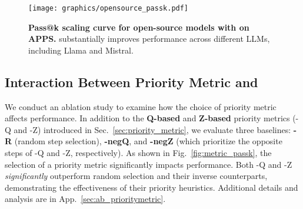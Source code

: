 \begin{figure}
    \centering
    \vspace{-0.3cm}\texttt{[image: graphics/opensource\_passk.pdf]}
    \vspace{-0.3cm}
    \caption{\textbf{Pass@k scaling curve for open-source models with \decomp on APPS.} \decomp substantially improves performance across different LLMs, including Llama and Mistral.}
    \vspace{-0.6cm}
    \label{fig:opensource_passk}
\end{figure}



\subsection{Interaction Between Priority Metric and \decomp}

We conduct an ablation study to examine how the choice of priority metric affects \decomp performance. In addition to the \textbf{Q-based} and \textbf{Z-based} priority metrics (\decomp-Q and \decomp-Z) introduced in Sec.~\ref{sec:priority_metric}, we evaluate three baselines: \textbf{\decomp-R} (random step selection), \textbf{\decomp-negQ}, and \textbf{\decomp-negZ} (which prioritize the opposite steps of \decomp-Q and \decomp-Z, respectively). As shown in Fig.~\ref{fig:metric_passk}, the selection of a priority metric significantly impacts performance. Both \decomp-Q and \decomp-Z \emph{significantly} outperform random selection and their inverse counterparts, demonstrating the effectiveness of their priority heuristics. Additional details and analysis are in App.~\ref{sec:ab_prioritymetric}.

